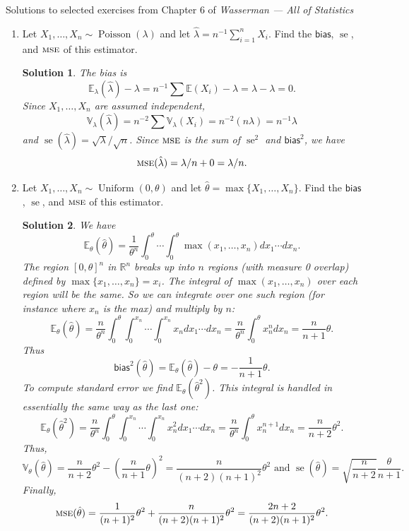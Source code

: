 \documentclass[10pt]{article}
\newtheorem*{sol}{Solution}
\newcommand{\R}{\mathbb{R}}
\newcommand{\V}{\mathbb{V}}
\newcommand{\E}{\mathbb{E}}
\newcommand{\Unif}{\operatorname{Uniform}}
\newcommand{\Poiss}{\operatorname{Poisson}}
\newcommand{\se}{\operatorname{se}}
\newcommand{\MSE}{\textsc{mse}}
\newcommand{\bias}{\mathsf{bias}}
\begin{document}
\noindent \large{Solutions to selected exercises from Chapter 6 of
\emph{Wasserman --- All of Statistics}}

\begin{enumerate}
\item[(1)] Let $X_1, \ldots, X_n \sim \Poiss(\lambda)$
and let $\hat\lambda = n^{-1}\sum_{i=1}^n X_i$. Find the $\bias$,
$\se$, and $\MSE$ of this estimator.

\begin{sol}
The bias is
\[
\E_\lambda(\hat\lambda)-\lambda = n^{-1}\sum \E(X_i) -\lambda=
\lambda - \lambda=0.
\]
Since $X_1,\ldots,X_n$ are assumed independent,
\[
\V_\lambda(\hat\lambda)=n^{-2} \sum \V_\lambda(X_i) = n^{-2}(n\lambda)=
n^{-1}\lambda
\]
and $\se(\hat\lambda)=\sqrt{\lambda}/\sqrt{n}$.
Since $\MSE$ is the sum of $\se^2$ and $\bias^2$, we have
\[
\MSE(\hat\lambda)=\lambda/n + 0 = \lambda/n.
\]
\end{sol}

\item[(2)] Let $X_1,\ldots, X_n \sim \Unif(0,\theta)$ and let
$\hat\theta = \max\{X_1 , \ldots, X_n\}$. Find the
$\bias$, $\se$, and $\MSE$ of this estimator.

\begin{sol}
We have
\[
\E_\theta(\hat\theta) = \frac{1}{\theta^n}\int_0^\theta \cdots \int_0^\theta
\max(x_1,\ldots,x_n)dx_1\cdots dx_n.
\]
The region $[0,\theta]^n$ in $\R^n$ breaks up into $n$ regions (with measure 0
overlap) defined by $\max\{x_1,\ldots,x_n\}=x_i$. The integral of
$\max(x_1,\ldots,x_n)$ over each region will be the same. So we can integrate
over one such region (for instance where $x_n$ is the max) and multiply by $n$:
\[
\E_\theta(\hat\theta) =
\frac{n}{\theta^n} \int_0^\theta \int_0^{x_n} \cdots \int_0^{x_n} x_n dx_1\cdots dx_n
= \frac{n}{\theta^n} \int_0^\theta x_n^n dx_n = \frac{n}{n+1}\theta.
\]
Thus
\[
\bias^2(\hat\theta)=\E_\theta(\hat\theta)-\theta=-\frac{1}{n+1}\theta.
\]
To compute standard error we find $\E_\theta(\hat\theta^2)$. This integral is
handled in essentially the same way as the last one:
\[
\E_\theta(\hat\theta^2)=
\frac{n}{\theta^n} \int_0^\theta\int_0^{x_n}\cdots\int_0^{x_n}x_n^2dx_1\cdots dx_n
= \frac{n}{\theta^n} \int_0^\theta x_n^{n+1}dx_n =\frac{n}{n+2}\theta^2.
\]
Thus,
\[
\V_\theta(\hat\theta) = \frac{n}{n+2} \theta^2 - \left(\frac{n}{n+1}\theta\right)^2
= \frac{n}{(n+2)(n+1)^2}\theta^2 \text{ and }
\se(\hat\theta) = \sqrt{\frac{n}{n+2}} \frac{\theta}{n+1}.
\]
Finally,
\[
\MSE(\hat\theta) = \frac{1}{(n+1)^2}\theta^2 +\frac{n}{(n+2)(n+1)^2}\theta^2
=\frac{2n+2}{(n+2)(n+1)^2}\theta^2.
\]
\end{sol}


\end{enumerate}
\end{document}
